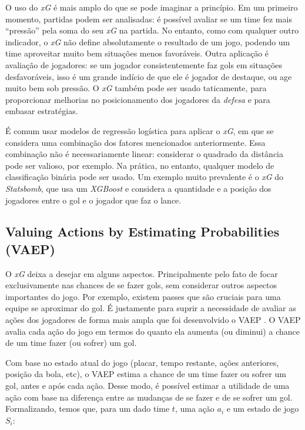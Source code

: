 \documentclass{article}
\begin{document}
O uso do \textit{xG} é mais amplo do que se pode imaginar a princípio. Em um
primeiro momento, partidas podem ser analisadas: é possível avaliar se um time
fez mais ``pressão'' pela soma do seu \textit{xG} na partida. No entanto, como
com qualquer outro indicador, o \textit{xG} não define absolutamente o
resultado de um jogo, podendo um time aproveitar muito bem situações menos
favoráveis. Outra aplicação é avaliação de jogadores: se um jogador
consistentemente faz gols em situações desfavoráveis, isso é um grande indício
de que ele é jogador de destaque, ou age muito bem sob pressão. O \textit{xG}
também pode ser usado taticamente, para proporcionar melhorias no
posicionamento dos jogadores da \textit{defesa} e para embasar estratégias.

É comum usar modelos de regressão logística para aplicar o \textit{xG}, em que
se considera uma combinação dos fatores mencionados anteriormente. Essa
combinação não é necessariamente linear: considerar o quadrado da distância
pode ser valioso, por exemplo. Na prática, no entanto, qualquer modelo de
classificação binária pode ser usado. Um exemplo muito prevalente é o
\textit{xG} do \textit{Statsbomb}, que usa um \textit{XGBoost} e considera a
quantidade e a posição dos jogadores entre o gol e o jogador que faz o lance.

\subsection{Valuing Actions by Estimating Probabilities (VAEP)}

O \textit{xG} deixa a desejar em alguns aspectos. Principalmente pelo fato de
focar exclusivamente nas chances de se fazer gols, sem considerar outros
aspectos importantes do jogo. Por exemplo, existem passes que são cruciais para
uma equipe se aproximar do gol. É justamente para suprir a necessidade de
avaliar as ações dos jogadores de forma mais ampla que foi desenvolvido o VAEP
\cite{vaep}. O VAEP avalia cada ação do jogo em termos do quanto ela aumenta (ou
diminui) a chance de um time fazer (ou sofrer) um gol.

Com base no estado atual do jogo (placar, tempo restante, ações anteriores,
posição da bola, etc), o VAEP estima a chance de um time fazer ou sofrer um gol,
antes e após cada ação. Desse modo, é possível estimar a utilidade de uma ação
com base na diferença entre as mudanças de se fazer e de se sofrer um gol.
Formalizando, temos que, para um dado time $t$, uma ação $a_i$ e um estado de
jogo $S_i$:
\end{document}
